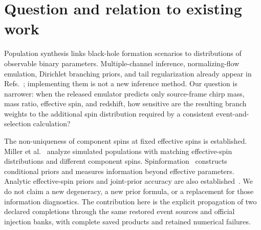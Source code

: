 \begin{abstract}
We examine how a published four-dimensional formation-channel model can be connected consistently to event posterior samples and search injections with additional spin coordinates. We retain a fixed 69-event GWTC-3-era catalog and all 11,180,578 restored posterior rows. Five released channel emulators are evaluated at birth spin 0.1 and common-envelope efficiency 2, on an explicitly restricted mass, redshift, and spin domain. Two declared conditional spin completions, three regularizer probabilities, two O3 injection banks, and two search policies define 24 conditional fits. The largest movement of an intrinsic branch median is \MaxReg\ percentage points across regularizers, \MaxHidden\ across hidden-spin completions, \MaxBank\ across banks, and \MaxPolicy\ across search policies. Independent posterior algorithms agree within \MaxIndependent\ percentage points in the checked quantiles. A one-percent common density term can contribute about twelve percent of the detected model mixture because its computed efficiency greatly exceeds that of the common-envelope model. These are controlled fixed-bank sensitivity results, not cosmic formation-fraction measurements or a certification of historical selection protocols. Low event and injection weight concentration remains a consequential open uncertainty.
\end{abstract}

\section{Question and relation to existing work}
Population synthesis links black-hole formation scenarios to distributions of observable binary parameters. Multiple-channel inference, normalizing-flow emulation, Dirichlet branching priors, and tail regularization already appear in Refs.~\cite{zevin,colloms}; implementing them is not a new inference method. Our question is narrower: when the released emulator predicts only source-frame chirp mass, mass ratio, effective spin, and redshift, how sensitive are the resulting branch weights to the additional spin distribution required by a consistent event-and-selection calculation?

The non-uniqueness of component spins at fixed effective spins is established. Miller et al.~\cite{miller} analyze simulated populations with matching effective-spin distributions and different component spins. Spinformation~\cite{plunkett} constructs conditional priors and measures information beyond effective parameters. Analytic effective-spin priors and joint-prior accuracy are also established~\cite{callister,iwaya}. We do not claim a new degeneracy, a new prior formula, or a replacement for those information diagnostics. The contribution here is the explicit propagation of two declared completions through the same restored event sources and official injection banks, with complete saved products and retained numerical failures.

